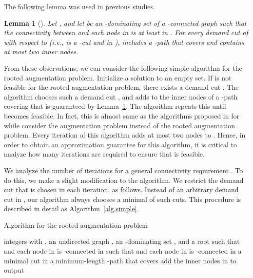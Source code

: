\documentclass[11pt]{article}
\newtheorem{lemma}{Lemma}
\begin{document}
The following lemma was used in previous studies.

\begin{lemma}[\cite{Shang:2007jg,WangKAGLZW13,Wang:2015}]\label{lem.path}
 Let , and 
 let  be an -dominating set  of a -connected graph 
 such that the connectivity between  and each node in 
 is at least  in .
 For every demand cut  of  with respect to 
 (i.e.,  is a -cut and  in ),  includes a -path that covers 
 and contains at most two inner nodes.
\end{lemma}

  
From these observations, we can consider
the following simple algorithm for the rooted augmentation
problem.
Initialize a solution  to an empty set.
If  is not feasible for the rooted augmentation problem,
there exists a demand cut .
The algorithm 
chooses such a demand cut , and adds to 
the inner nodes of a
-path covering  that is guaranteed by
Lemma~\ref{lem.path}.
The algorithm repeats this until  becomes feasible.
In fact, this is almost same as the algorithms proposed in
\cite{Shang:2007jg,Wang:2015}
for  while \cite{Shang:2007jg,Wang:2015} consider
the augmentation problem instead of the rooted augmentation problem.
Every iteration of this algorithm adds at most two nodes to .
Hence,
in order to obtain an approximation guarantee for this algorithm,
it is critical to analyze how many iterations are
required to ensure that  is feasible.

We analyze the number of iterations for a general connectivity requirement .
To do this, we make a slight modification to the algorithm.
We restrict the demand cut
 that is chosen in each iteration, as follows.
Instead of an arbitrary demand cut in ,
our algorithm
always chooses a minimal of such cuts.
This procedure is described in detail as Algorithm~\ref{alg.simple}.

 \begin{algorithm}
  \caption{Algorithm for the rooted augmentation problem}
  \label{alg.simple}
  \begin{algorithmic}
   \REQUIRE
   integers   with ,
   an undirected graph ,
   an -dominating set ,
   and a root  such that
    and each node in  is
   -connected in 
   \ENSURE  such that
    and each node in  is -connected in 
   \STATE 
   \STATE  a minimal cut in 
   \STATE  a minimum-length -path that covers 
   \STATE add the inner nodes in  to 
   \ENDWHILE
   \STATE output 
  \end{algorithmic}
 \end{algorithm}
\end{document}
